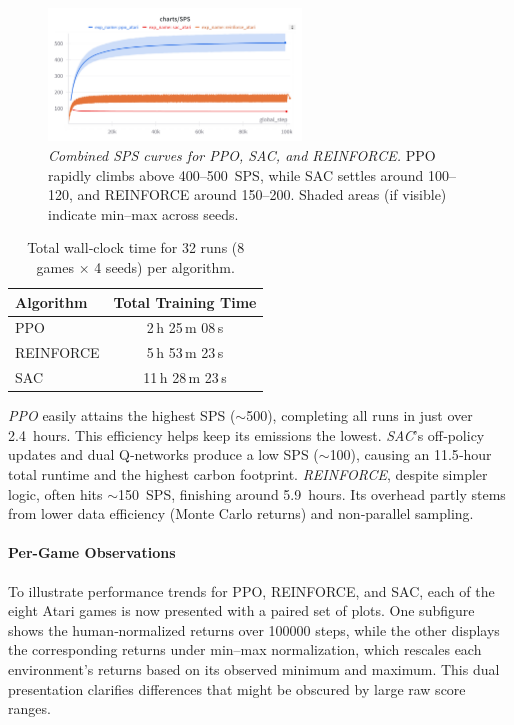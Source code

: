 \begin{figure} 
	\centering
	\includegraphics[width=0.6\textwidth]{figures/policy_comparison/policy_sps_comparison.png}
	\caption{\emph{Combined SPS curves for PPO, SAC, and REINFORCE.}
		PPO rapidly climbs above 400--500~SPS, while SAC settles around 100--120, and REINFORCE around 150--200. 
		Shaded areas (if visible) indicate min--max across seeds.}
	\label{fig:policy_sps_comparison}
\end{figure}

\begin{table} 
	\centering
	\caption{Total wall‐clock time for 32 runs (8 games × 4 seeds) per algorithm.}
	\label{tab:policy_training_time}
	\begin{tabular}{lc}
		\toprule
		\textbf{Algorithm} & \textbf{Total Training Time}\\
		\midrule
		PPO         & 2\,h 25\,m 08\,s \\
		REINFORCE   & 5\,h 53\,m 23\,s \\
		SAC         & 11\,h 28\,m 23\,s \\
		\bottomrule
	\end{tabular}
\end{table}

\emph{PPO} easily attains the highest SPS ($\sim$\num{500}), completing all runs in just over 2.4~hours. This efficiency helps keep its emissions the lowest.  
\emph{SAC}'s off‐policy updates and dual Q‐networks produce a low SPS ($\sim$\num{100}), causing an 11.5‐hour total runtime and the highest carbon footprint.  
\emph{REINFORCE}, despite simpler logic, often hits $\sim$\num{150}~SPS, finishing around 5.9~hours. Its overhead partly stems from lower data efficiency (Monte Carlo returns) and non‐parallel sampling.

\paragraph{Per-Game Observations}
To illustrate performance trends for PPO, REINFORCE, and SAC, each of the eight Atari games is now presented with a paired set of plots. One subfigure shows the human‐normalized returns over \num{100000} steps, while the other displays the corresponding returns under min--max normalization, which rescales each environment's returns based on its observed minimum and maximum. This dual presentation clarifies differences that might be obscured by large raw score ranges.

